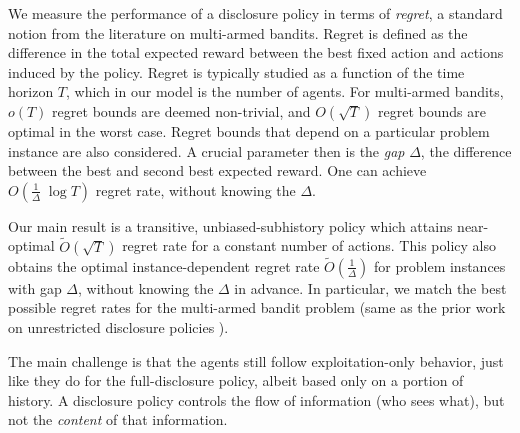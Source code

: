 
 We measure the performance of a disclosure policy in terms of \emph{regret}, a standard notion from the literature on multi-armed bandits. Regret is defined as the difference in the total expected reward between the best fixed action and actions induced by the policy. Regret is typically studied as a function of the time horizon $T$, which in our model is the number of agents. For multi-armed bandits, $o(T)$ regret bounds are deemed non-trivial, and $O(\sqrt{T})$ regret bounds are optimal in the worst case. Regret bounds that depend on a particular problem instance are also considered. A crucial parameter then is the \emph{gap} $\Delta$, the difference between the best and second best expected reward. One can achieve $O(\tfrac{1}{\Delta}\; \log T)$ regret rate, without knowing the $\Delta$.

Our main result is a transitive, unbiased-subhistory policy which attains near-optimal $\tilde{O}(\sqrt{T})$ regret rate for a constant number of actions. This policy also obtains the optimal instance-dependent regret rate
    $\tilde{O}(\tfrac{1}{\Delta})$
for problem instances with gap $\Delta$, without knowing the $\Delta$ in advance. In particular, we match the best possible regret rates for the multi-armed bandit problem (same as the prior work on unrestricted disclosure policies \cite{ICexploration-ec15-working}). 

The main challenge is that the agents still follow exploitation-only behavior, just like they do for the full-disclosure policy, albeit based only on a portion of history. A disclosure policy controls the flow of information (who sees what), but not the \emph{content} of that information.

